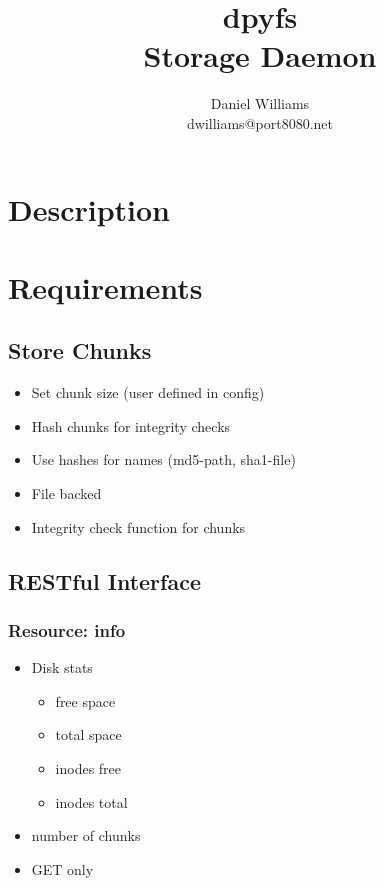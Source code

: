 \documentclass[letterpaper]{article}
\title{dpyfs \\ Storage Daemon}
\author{Daniel Williams \\ dwilliams@port8080.net}
\begin{document}
\maketitle

\section{Description}

\section{Requirements}

\subsection{Store Chunks}

\begin{itemize}
\item
Set chunk size (user defined in config)

\item
Hash chunks for integrity checks

\item
Use hashes for names (md5-path, sha1-file)

\item
File backed

\item
Integrity check function for chunks
\end{itemize}

\subsection{RESTful Interface}

\subsubsection{Resource: info}

\begin{itemize}
\item
Disk stats
\begin{itemize}
\item
free space

\item
total space

\item
inodes free

\item
inodes total
\end{itemize}

\item
number of chunks

\item
GET only
\end{itemize}
\end{document}
